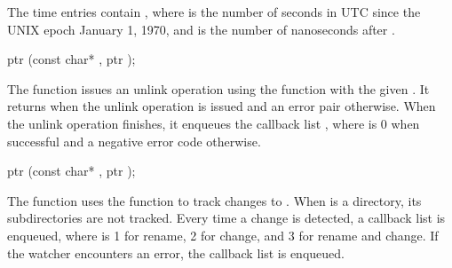 \begin{tuple}\end{tuple}\antipar
\begin{argtbl}
\end{argtbl}

The time entries contain , where
 is the number of seconds in UTC since the UNIX epoch January
1, 1970, and  is the number of nanoseconds after .

\begin{function}
  ptr (const char* , ptr );
\end{function}

The  function issues an unlink operation using the
 function with the given . It returns
 when the unlink operation is issued and an error pair
otherwise. When the unlink operation finishes, it enqueues the
callback list , where 
is 0 when successful and a negative error code otherwise.

\begin{function}
  ptr (const char* , ptr );
\end{function}

The  function uses the
 function to track changes to
. When  is a directory, its subdirectories are not
tracked. Every time a change is detected, a callback list
 is enqueued, where
 is 1 for rename, 2 for change, and 3 for rename and
change.  If the watcher encounters an error, the callback list
 is enqueued.


